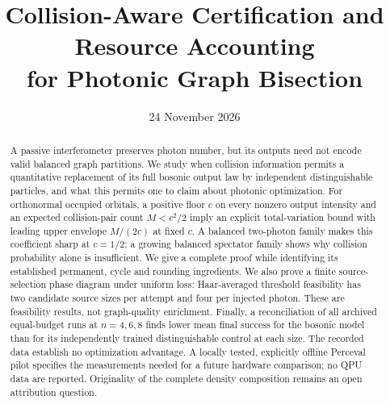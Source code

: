 \documentclass[11pt,a4paper]{article}
\title{Collision-Aware Certification and Resource Accounting\\for Photonic Graph Bisection}
\author{}
\date{24 November 2026}
\theoremstyle{remark}\newtheorem{remark}[theorem]{Remark}
\begin{document}
\maketitle
\begin{abstract}
A passive interferometer preserves photon number, but its outputs need not encode valid balanced graph partitions. We study when collision information permits a quantitative replacement of its full bosonic output law by independent distinguishable particles, and what this permits one to claim about photonic optimization. For orthonormal occupied orbitals, a positive floor $c$ on every nonzero output intensity and an expected collision-pair count $M<c^2/2$ imply an explicit total-variation bound with leading upper envelope $M/(2c)$ at fixed $c$. A balanced two-photon family makes this coefficient sharp at $c=1/2$; a growing balanced spectator family shows why collision probability alone is insufficient. We give a complete proof while identifying its established permanent, cycle and rounding ingredients. We also prove a finite source-selection phase diagram under uniform loss: Haar-averaged threshold feasibility has two candidate source sizes per attempt and four per injected photon. These are feasibility results, not graph-quality enrichment. Finally, a reconciliation of all \ErunCount{} archived equal-budget runs at $n=4,6,8$ finds lower mean final success for the bosonic model than for its independently trained distinguishable control at each size. The recorded data establish no optimization advantage. A locally tested, explicitly offline Perceval pilot specifies the measurements needed for a future hardware comparison; no QPU data are reported. Originality of the complete density composition remains an open attribution question.
\end{abstract}









\appendix


\end{document}
